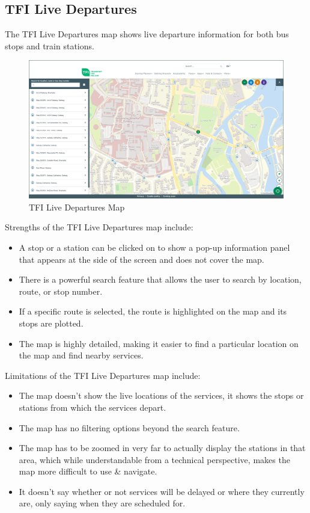 \documentclass[a4paper,11pt]{article}
\begin{document}
\subsection{TFI Live Departures}
The TFI Live Departures map\supercite{tfilive} shows live departure information for both bus stops and train stations.
\begin{figure}[H]
    \centering
    \includegraphics[width=\textwidth]{./images/tfi.png}
    \caption{TFI Live Departures Map}
\end{figure}

Strengths of the TFI Live Departures map include:
\begin{itemize}
    \item   A stop or a station can be clicked on to show a pop-up information panel that appears at the side of the screen and does not cover the map.
    \item   There is a powerful search feature that allows the user to search by location, route, or stop number.
    \item   If a specific route is selected, the route is highlighted on the map and its stops are plotted.
    \item   The map is highly detailed, making it easier to find a particular location on the map and find nearby services.
\end{itemize}

Limitations of the TFI Live Departures map include:
\begin{itemize}
    \item   The map doesn't show the live locations of the services, it shows the stops or stations from which the services depart.
    \item   The map has no filtering options beyond the search feature.
    \item   The map has to be zoomed in very far to actually display the stations in that area, which while understandable from a technical perspective, makes the map more difficult to use \& navigate.
    \item   It doesn't say whether or not services will be delayed or where they currently are, only saying when they are scheduled for.
\end{itemize}
\end{document}
